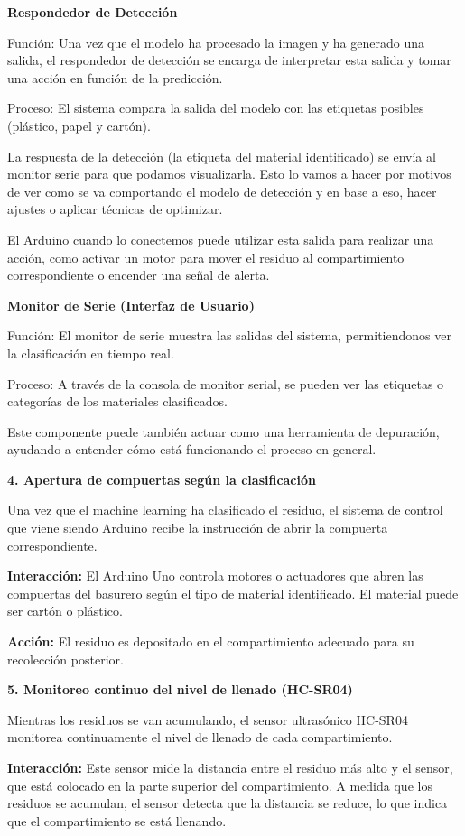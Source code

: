 \textbf{Respondedor de Detección}

Función: Una vez que el modelo ha procesado la imagen y ha generado una salida, el respondedor de detección se encarga de interpretar esta salida y tomar una acción en función de la predicción.

Proceso:
El sistema compara la salida del modelo con las etiquetas posibles (plástico, papel y cartón).

La respuesta de la detección (la etiqueta del material identificado) se envía al monitor serie para que podamos visualizarla.
Esto lo vamos a hacer por motivos de ver como se va comportando el modelo de detección y en base a eso, hacer ajustes o aplicar técnicas de optimizar.


El Arduino cuando lo conectemos puede utilizar esta salida para realizar una acción, como activar un motor para mover el residuo al compartimiento correspondiente o encender una señal de alerta.

\textbf{Monitor de Serie (Interfaz de Usuario)}

Función: El monitor de serie muestra las salidas del sistema, permitiendonos ver la clasificación en tiempo real.

Proceso:
A través de la consola de monitor serial, se pueden ver las etiquetas o categorías de los materiales clasificados.

Este componente puede también actuar como una herramienta de depuración, ayudando a entender cómo está funcionando el proceso en general.


	\textbf{4. Apertura de compuertas según la clasificación} 

Una vez que el machine learning ha clasificado el residuo, el sistema de control que viene siendo Arduino recibe la instrucción de abrir la compuerta correspondiente. 

    \textbf{Interacción:} El Arduino Uno controla motores o actuadores que abren las compuertas del basurero según el tipo de material identificado. El material puede ser cartón o plástico. 

	\textbf{Acción:} El residuo es depositado en el compartimiento adecuado para su recolección posterior. 

	\textbf{5. Monitoreo continuo del nivel de llenado (HC-SR04)} 

Mientras los residuos se van acumulando, el sensor ultrasónico HC-SR04 monitorea continuamente el nivel de llenado de cada compartimiento. 

    \textbf{Interacción:} Este sensor mide la distancia entre el residuo más alto y el sensor, que está colocado en la parte superior del compartimiento. A medida que los residuos se acumulan, el sensor detecta que la distancia se reduce, lo que indica que el compartimiento se está llenando. 

